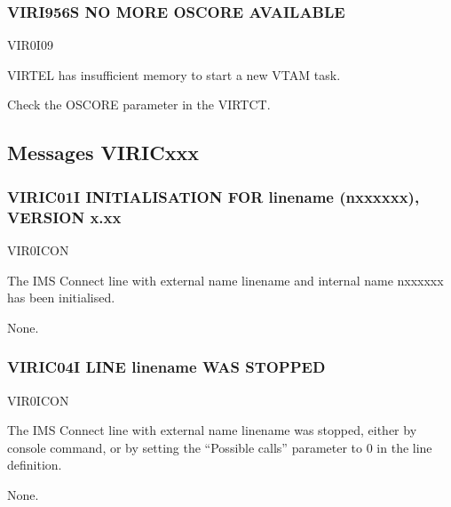 \documentclass[letterpaper,10pt,english]{sphinxmanual}
\begin{document}
\subsubsection{VIRI956S NO MORE OSCORE AVAILABLE}
\label{\detokenize{messages:viri956s-no-more-oscore-available}}\begin{description}
\sphinxAtStartPar
VIR0I09

\sphinxAtStartPar
VIRTEL has insufficient memory to start a new VTAM task.

\sphinxAtStartPar
Check the OSCORE parameter in the VIRTCT.

\end{description}


\subsection{Messages VIRICxxx}
\label{\detokenize{messages:messages-viricxxx}}

\subsubsection{VIRIC01I INITIALISATION FOR linename (n\sphinxhyphen{}xxxxxx), VERSION x.xx}
\label{\detokenize{messages:viric01i-initialisation-for-linename-n-xxxxxx-version-x-xx}}\begin{description}
\sphinxAtStartPar
VIR0ICON

\sphinxAtStartPar
The IMS Connect line with external name linename and internal name n\sphinxhyphen{}xxxxxx has been initialised.

\sphinxAtStartPar
None.

\end{description}


\subsubsection{VIRIC04I LINE linename WAS STOPPED}
\label{\detokenize{messages:viric04i-line-linename-was-stopped}}\begin{description}
\sphinxAtStartPar
VIR0ICON

\sphinxAtStartPar
The IMS Connect line with external name linename was stopped, either by console command, or by setting the “Possible calls” parameter to 0 in the line definition.

\sphinxAtStartPar
None.

\end{description}
\end{document}
